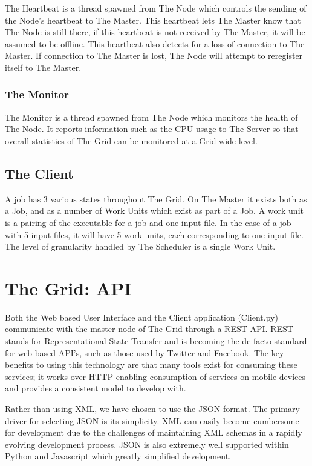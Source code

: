 The Heartbeat is a thread spawned from The Node which controls the sending of the Node's heartbeat to The Master. This heartbeat lets The Master know that The Node is still there, if this heartbeat is not received by The Master, it will be assumed to be offline. This heartbeat also detects for a loss of connection to The Master. If connection to The Master is lost, The Node will attempt to reregister itself to The Master. 

\subsection{The Monitor}
\label{themonitor}

The Monitor is a thread spawned from The Node which monitors the health of The Node. It reports information such as the CPU usage to The Server so that overall statistics of The Grid can be monitored at a Grid-wide level.

\section{The Client}
\label{theclient}

A job has 3 various states throughout The Grid. On The Master it exists both as a Job, and as a number of Work Units which exist as part of a Job. A work unit is a pairing of the executable for a job and one input file. In the case of a job with 5 input files, it will have 5 work units, each corresponding to one input file. The level of granularity handled by The Scheduler is a single Work Unit. 

\chapter{The Grid: API}
\label{thegrid:api}

Both the Web based User Interface and the Client application (Client.py) communicate with the master node of The Grid through a REST API. REST stands for Representational State Transfer and is becoming the de-facto standard for web based API's, such as those used by Twitter and Facebook. The key benefits to using this technology are that many tools exist for consuming these services; it works over HTTP enabling consumption of services on mobile devices and provides a consistent model to develop with.

Rather than using XML, we have chosen to use the JSON format. The primary driver for selecting JSON is its simplicity. XML can easily become cumbersome for development due to the challenges of maintaining XML schemas in a rapidly evolving development process. JSON is also extremely well supported within Python and Javascript which greatly simplified development.

